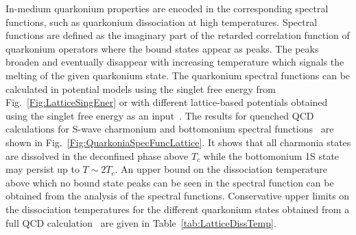 In-medium quarkonium properties are encoded in the corresponding 
spectral functions, such as quarkonium dissociation
at high temperatures. Spectral functions are defined as
the imaginary part of the retarded correlation function of quarkonium
operators where the bound states appear as peaks.
The peaks broaden and eventually disappear with increasing temperature which
signals the melting of the given quarkonium state.
The quarkonium spectral functions can be calculated in potential models 
using the singlet free energy from Fig.~\ref{Fig:LatticeSingEner} or with different 
lattice-based potentials obtained using the singlet free energy
as an input~\cite{Mocsy:2007yj,Mocsy:2007jz}. 
The results for quenched QCD calculations
for S-wave charmonium  and bottomonium spectral functions~\cite{Mocsy:2007yj}
are shown in Fig.~\ref{Fig:QuarkoniaSpecFuncLattice}.
It shows that all charmonia states are dissolved in the deconfined phase above $T_c$ while the
bottomonium 1S state may persist up to $T \sim 2T_c$. An upper bound on the dissociation
temperature above which no bound state peaks can be seen in the spectral function can be
obtained from the analysis of the spectral functions.
Conservative upper limits on the dissociation temperatures for the different quarkonium
states obtained from  a full QCD calculation~\cite{Mocsy:2007jz} are given in
Table~\ref{tab:LatticeDissTemp}.


